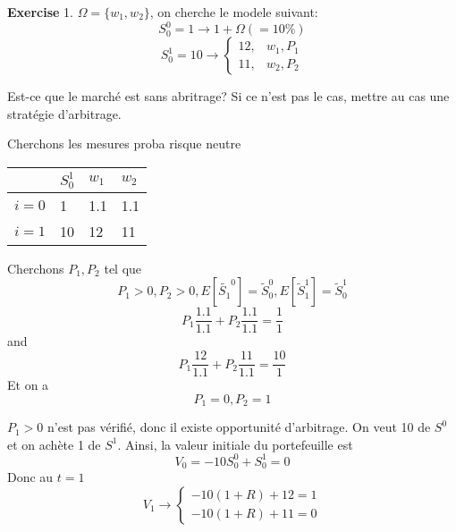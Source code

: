 \documentclass{article}
\theoremstyle{plain}
\theoremstyle{definition}
\begin{document}
\textbf{Exercise}
1. $\Omega=\{w_1, w_2\}$, on cherche le modele suivant:
\begin{equation}
	S_0^0=1 \rightarrow 1+\Omega(=10\%)
\end{equation}
\begin{equation}
	S_0^1=10\rightarrow\left\{
	\begin{array}{rc}
		12, &w_1,P_1\\
		11, &w_2,P_2
	\end{array}\right.
\end{equation}

Est-ce que le march\'e est sans abritrage? Si ce n'est pas le cas, mettre au cas une strat\'egie d'arbitrage.

Cherchons les mesures proba risque neutre
\begin{center}
\begin{tabular}{l|lll}
   & $S_0^1$ & $w_1$ & $w_2$ \\ \hline 
 $i=0$ & 1 & 1.1 & 1.1 \\
 $i=1$ & 10 & 12 & 11 \\
\end{tabular}	
\end{center}

Cherchons $P_1, P_2$ tel que 
\begin{equation}
P_1>0, P_2>0, E[\tilde{S_1}^0] = \tilde{S}_0^0, E[\tilde{S}_1^1]=\tilde{S}_0^1
\end{equation}
\begin{equation}
	P_1\frac{1.1}{1.1}+P_2\frac{1.1}{1.1}=\frac{1}{1} 
\end{equation}
and
\begin{equation}
	P_1\frac{12}{1.1}+P_2\frac{11}{1.1}=\frac{10}{1}
\end{equation}
Et on a
\begin{equation}
P_1=0, P_2=1
\end{equation}
 
$P_1>0$ n'est pas v\'erifi\'e, donc il existe opportunit\'e d'arbitrage.
On veut 10 de $S^0$ et on ach\`ete 1 de $S^1$. Ainsi, la valeur initiale du portefeuille est
\begin{equation}
	V_0=-10S_0^0+S_0^1=0
\end{equation}
Donc au $t=1$
\begin{equation}
V_1\rightarrow
\left\{\begin{array}{rc}
	-10(1+R)+12=1\\
	-10(1+R)+11=0
\end{array}\right.
\end{equation}
\end{document}
